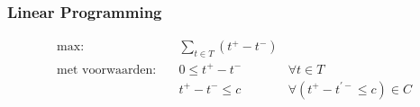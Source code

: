 \begin{frame}\frametitle{Linear Programming}
    \begin{definitie}
        \begin{align}
            \text{max:}& \quad \sum_{t \in T} (t^+ - t^-) & \nonumber \\
            \text{met voorwaarden:} & \quad 0 \leq t^+ - t^- & \forall t \in T \nonumber \\
                                    & \quad t^+ - t^- \leq c & \forall (t^+ - t^{'-} \leq c) \in C \nonumber
        \end{align}
    \end{definitie}
\end{frame}
